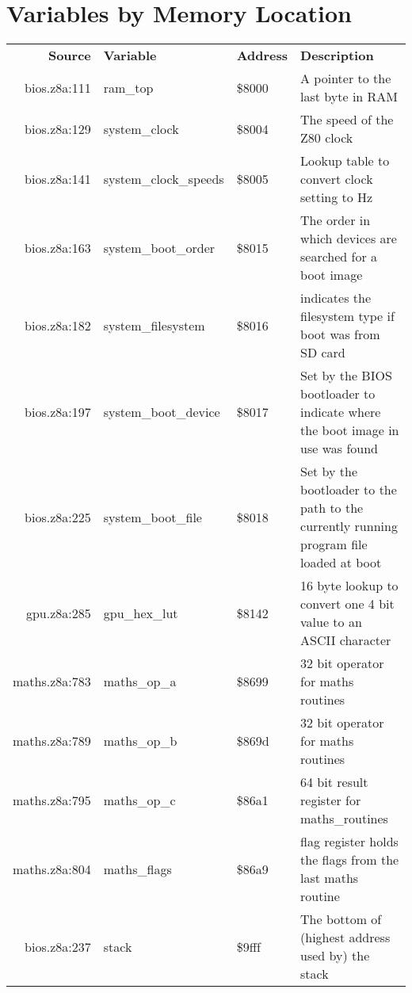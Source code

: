 \section{Variables by Memory Location}
\begin{tabular}{rllp{7cm}}
 \textbf{Source}&\textbf{Variable}&\textbf{Address}&\textbf{Description}\\
 bios.z8a:111&ram\_top&\$8000&A pointer to the last byte in RAM\\
 bios.z8a:129&system\_clock&\$8004&The speed of the Z80 clock\\
 bios.z8a:141&system\_clock\_speeds&\$8005&Lookup table to convert clock setting to Hz\\
 bios.z8a:163&system\_boot\_order&\$8015&The order in which devices are searched for a boot image\\
 bios.z8a:182&system\_filesystem&\$8016&indicates the filesystem type if boot was from SD card\\
 bios.z8a:197&system\_boot\_device&\$8017&Set by the BIOS bootloader to indicate where the boot image in use was found\\
 bios.z8a:225&system\_boot\_file&\$8018&Set by the bootloader to the path to the currently running program file loaded at boot\\
 gpu.z8a:285&gpu\_hex\_lut&\$8142&16 byte lookup to convert one 4 bit value to an ASCII character\\
 maths.z8a:783&maths\_op\_a&\$8699&32 bit operator for maths routines\\
 maths.z8a:789&maths\_op\_b&\$869d&32 bit operator for maths routines\\
 maths.z8a:795&maths\_op\_c&\$86a1&64 bit result register for maths\_routines\\
 maths.z8a:804&maths\_flags&\$86a9&flag register holds the flags from the last maths routine\\
 bios.z8a:237&stack&\$9fff&The bottom of (highest address used by) the stack\\
\end{tabular}

